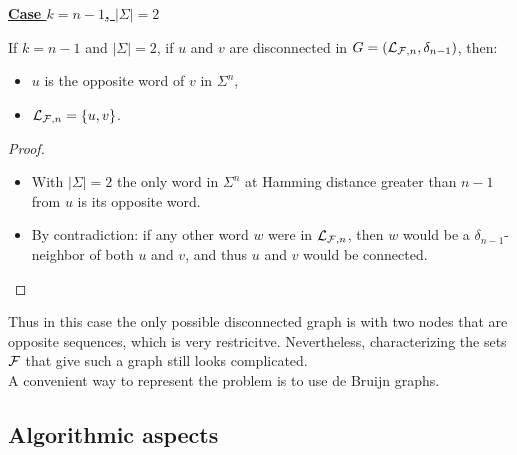 \documentclass{article}
\begin{document}
\noindent
\underline{\textbf{Case $k = n-1$, $|\Sigma| = 2$}} \\

\begin{result}
	If $k = n-1$ and $|\Sigma| = 2$, if $u$ and $v$ are disconnected in $G = (\mathcal{L}_{\mathcal{F}, n}, \delta_{n-1})$, then:
	\begin{itemize}
		\item $u$ is the opposite word of $v$ in $\Sigma^n$,
		\item $\mathcal{L}_{\mathcal{F}, n} = \{u,v\}$.
	\end{itemize}
\end{result}
\begin{proof}
	\noindent
	\begin{itemize}
		\item With $|\Sigma| = 2$ the only word in $\Sigma^n$ at Hamming distance greater than $n-1$ from $u$ is its opposite word.
		\item By contradiction: if any other word $w$ were in $\mathcal{L}_{\mathcal{F}, n}$, then $w$ would be a $\delta_{n-1}$-neighbor of both $u$ and $v$, and thus $u$ and $v$ would be connected.
	\end{itemize}
\end{proof}

Thus in this case the only possible disconnected graph is with two nodes that are opposite sequences, which is very restricitve. Nevertheless, characterizing the sets $\mathcal{F}$ that give such a graph still looks complicated. \\
A convenient way to represent the problem is to use de Bruijn graphs.

\subsection{Algorithmic aspects}
\end{document}
